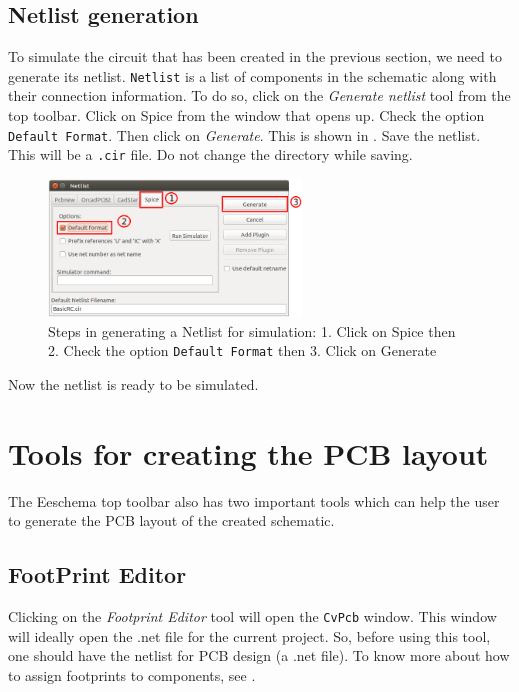 \subsection{Netlist generation}
\label{chap5-netlist-generation}
To simulate the circuit that has been created in the previous section, we
need to generate its netlist. {\tt Netlist} is a list of components in
the schematic along with their connection information. 
To do so, click on the \textit{Generate netlist} tool from the top
toolbar. Click on Spice from the window that opens up. Check the
option {\tt Default Format}. Then click on
\textit{Generate}. This is shown in . Save the
netlist. This will be a {\tt .cir} file. Do not change the directory
while saving. 
\begin{figure}[h]
\centering
\includegraphics[width=0.6\textwidth]{manual_images/netlist.png}
\caption{Steps in generating a Netlist for simulation: 1. Click on Spice then\\
 2. Check the option {\tt Default Format} then 3. Click on Generate}
\label{chap5net}
\end{figure} 
Now the netlist is ready to be simulated. 

\section {Tools for creating the PCB layout}
The Eeschema top toolbar also has two important tools which can help the user to generate the PCB layout of the created schematic.

\subsection {FootPrint Editor}
Clicking on the \textit{Footprint Editor} tool will open the {\tt CvPcb} 
 window. This window will ideally open the .net file for the 
current project. So, before using this tool, one should have the netlist 
for PCB design (a .net file). To know more about how to assign footprints 
to components, see .

